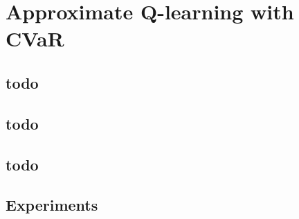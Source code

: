 \chapter{Approximate Q-learning with CVaR}\label{ch:dqn}



\section{todo}


\section{todo}


\section{todo}


\section{Experiments}

